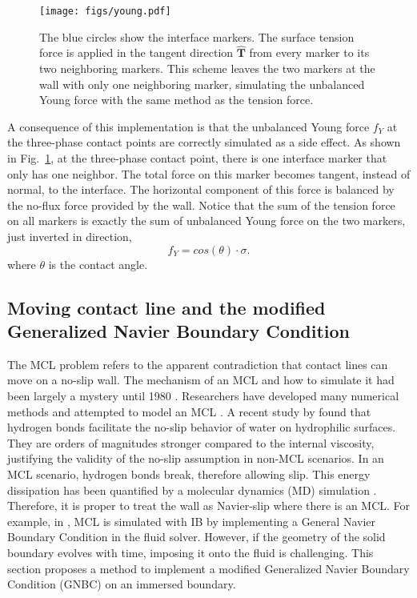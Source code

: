 \documentclass{jfm}
\begin{document}
\begin{figure}
    \centering
    \texttt{[image: figs/young.pdf]}
    \caption{\label{fig:young}
        The blue circles show the interface markers. The surface tension force is applied in the tangent direction $\bm{\hat{T}}$ from every marker to its two neighboring markers. This scheme leaves the two markers at the wall with only one neighboring marker, simulating the unbalanced Young force with the same method as the tension force. 
    }
\end{figure}
A consequence of this implementation is that the unbalanced Young force $f_Y$ at the three-phase contact points are correctly simulated as a side effect. As shown in Fig.~\ref{fig:young}, at the three-phase contact point, there is one interface marker that only has one neighbor. The total force on this marker becomes tangent, instead of normal, to the interface. The horizontal component of this force is balanced by the no-flux force provided by the wall. Notice that the sum of the tension force on all markers is exactly the sum of unbalanced Young force on the two markers, just inverted in direction, 
\begin{equation}
    f_Y = cos(\theta) \cdot \sigma. \label{eq:young}
\end{equation}
where $\theta$ is the contact angle. 

\subsection{Moving contact line and the modified Generalized Navier Boundary Condition} \label{subsec:mcl}
The MCL problem refers to the apparent contradiction that contact lines can move on a no-slip wall. The mechanism of an MCL and how to simulate it had been largely a mystery until 1980 \citep{1979_MCL_confusion}. Researchers have developed many numerical methods and attempted to model an MCL \citep{2014_MCL_review, curved_solid_DI_IB}. A recent study by \citet{its_the_bonds_original} found that hydrogen bonds facilitate the no-slip behavior of water on hydrophilic surfaces. They are orders of magnitudes stronger compared to the internal viscosity, justifying the validity of the no-slip assumption in non-MCL scenarios. In an MCL scenario, hydrogen bonds break, therefore allowing slip. This energy dissipation has been quantified by a molecular dynamics (MD) simulation \citep{MD_2018_its_the_bonds}. Therefore, it is proper to treat the wall as Navier-slip where there is an MCL. For example, in \citep{MCL_IBM_surfactant}, MCL is simulated with IB by implementing a General Navier Boundary Condition in the fluid solver. However, if the geometry of the solid boundary evolves with time, imposing it onto the fluid is challenging. This section proposes a method to implement a modified Generalized Navier Boundary Condition (GNBC) on an immersed boundary. 
\end{document}

